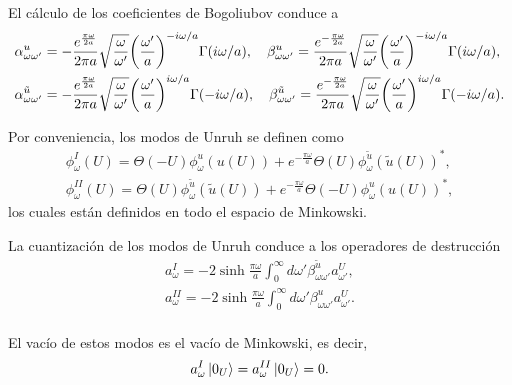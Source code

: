 El cálculo de los coeficientes de Bogoliubov conduce a 
\begin{equation}
  \begin{aligned}
    &\alpha_{\omega\omega'}^{ u} = -\frac{e^{\frac{\pi\omega}{2 a}}}{2\pi a}\sqrt{\frac{\omega}{\omega'}}\qty(\frac{\omega'}{a})^{-i\omega/a}
    \Gamma(i\omega/a), \quad
    \beta_{\omega\omega'}^{ u} = \frac{e^{-\frac{\pi\omega}{2 a}}}{2\pi a}\sqrt{\frac{\omega}{\omega'}}\qty(\frac{\omega'}{a})^{-i\omega/a}
    \Gamma(i\omega/a),\\
    &\alpha_{\omega\omega'}^{\tilde u} = -\frac{e^{\frac{\pi\omega}{2 a}}}{2\pi a}\sqrt{\frac{\omega}{\omega'}}\qty(\frac{\omega'}{a})^{i\omega/a}
    \Gamma(-i\omega/a), \quad
    \beta_{\omega\omega'}^{\tilde u} = \frac{e^{-\frac{\pi\omega}{2 a}}}{2\pi a}\sqrt{\frac{\omega}{\omega'}}\qty(\frac{\omega'}{a})^{i\omega/a} 
    \Gamma(-i\omega/a).
  \end{aligned}
\end{equation}

Por conveniencia, los modos de Unruh se definen como
\begin{equation}
  \begin{aligned}
    \phi^I_\omega(U)=\Theta(-U)\phi^u_\omega(u(U)) + e^{-\frac{\pi\omega}{a}}\Theta(U)\phi_\omega^{\tilde u}(\tilde u(U))^*,\\
    \phi^{II}_\omega(U)=\Theta(U)\phi^{\tilde u}_\omega(\tilde u(U)) + e^{-\frac{\pi\omega}{a}}\Theta(-U)\phi_\omega^{u}(u(U))^*,
  \end{aligned}
\end{equation}
los cuales están definidos en todo el espacio de Minkowski.

La cuantización de los modos de Unruh conduce a los operadores de destrucción
\begin{equation}
  \begin{aligned}
    a_\omega^I = -2\sinh\frac{\pi\omega}{a}\int_0^\infty d\omega' \beta_{\omega\omega'}^{\tilde u} a_{\omega'}^U,\\
    a_\omega^{II} = -2\sinh\frac{\pi\omega}{a}\int_0^\infty d\omega' \beta_{\omega\omega'}^{u} a_{\omega'}^U.\\
  \end{aligned}
\end{equation}

El vacío de estos modos es el vacío de Minkowski, es decir,
\begin{equation}
  a_\omega^I \ket{0_U} = a_\omega^{II}\ket{0_U} = 0.
\end{equation}
 
